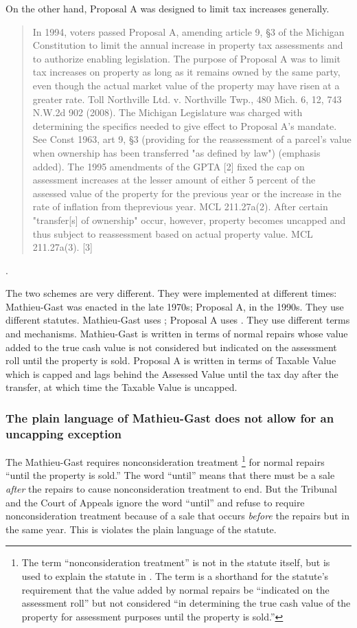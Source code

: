 \documentclass[12pt,\documentclassflag]{michiganCourtOfAppealsBrief}
\begin{document}
On the other hand, Proposal A was designed to limit tax increases generally.

\begin{quotation}
  In 1994, voters passed Proposal A, amending article 9, \S 3 of the Michigan Constitution to limit the annual increase in
property tax assessments and to authorize enabling legislation. The purpose of Proposal A was to limit tax increases on
property as long as it remains owned by the same party, even though the actual market value of the property may have
risen at a greater rate. Toll Northville Ltd. v. Northville Twp., 480 Mich. 6, 12, 743 N.W.2d 902 (2008). The Michigan
Legislature was charged with determining the specifics needed to give effect to Proposal A's mandate. See Const 1963, art
9, \S 3 (providing for the reassessment of a parcel's value when ownership has been transferred "as defined by law")
(emphasis added). The 1995 amendments of the GPTA [2] fixed the cap on assessment increases at the lesser amount of
either 5 percent of the assessed value of the property for the previous year or the increase in the rate of inflation from theprevious year. MCL 211.27a(2). After certain "transfer[s] of ownership" occur, however, property becomes uncapped and
thus subject to reassessment based on actual property value. MCL 211.27a(3). [3]
\end{quotation}
.

The two schemes are very different. They were implemented at different times: Mathieu-Gast was enacted in the late 1970s; Proposal A, in the 1990s. They use different statutes. Mathieu-Gast uses \mathieuGast; Proposal A uses \cite{MCL 211.27a(3)}. They use different terms and mechanisms. Mathieu-Gast is written in terms of normal repairs whose value added to the true cash value is not considered but indicated on the assessment roll until the property is sold. Proposal A is written in terms of Taxable Value which is capped and lags behind the Assessed Value until the tax day after the transfer, at which time the Taxable Value is uncapped.

\subsubsection{The plain language of Mathieu-Gast does not allow for an uncapping exception}

The Mathieu-Gast requires nonconsideration treatment%
\footnote{\label{nonconsiderationTreatmentFn}The term ``nonconsideration treatment'' is not in the statute itself, but is used to explain the statute in \cite{STC Bulletin}. The term is a shorthand for the statute's requirement that the value added by normal repairs be ``indicated on the assessment roll'' but not considered ``in determining the true cash value of the property for assessment purposes until the property is sold.''}
for normal repairs ``until the property is sold.'' The word ``until'' means that there must be a sale \emph{after} the repairs to cause nonconsideration treatment to end. But the Tribunal and the Court of Appeals ignore the word ``until'' and refuse to require nonconsideration treatment because of a sale that occurs \emph{before} the repairs but in the same year. This is violates the plain language of the statute.
\end{document}
